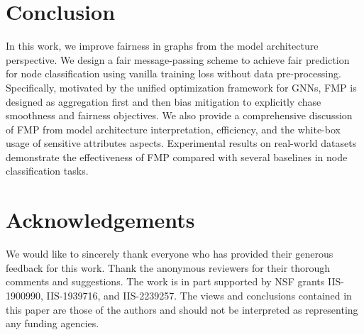 \documentclass[letterpaper]{article} %
\theoremstyle{plain}
\theoremstyle{definition}
\theoremstyle{remark}
\begin{document}
\section{Conclusion}
In this work, we improve fairness in graphs from the model architecture perspective. We design a fair message-passing scheme to achieve fair prediction for node classification using vanilla training loss without data pre-processing. Specifically,
motivated by the unified optimization framework for GNNs, FMP is designed as aggregation first and then bias mitigation to explicitly chase smoothness and fairness objectives. We also provide a comprehensive discussion of FMP from model architecture interpretation, efficiency, and the white-box usage of sensitive attributes aspects. Experimental results on real-world datasets demonstrate the effectiveness of FMP compared with several baselines in node classification tasks.


\section*{Acknowledgements}
We would like to sincerely thank everyone who has provided their generous feedback for this work. Thank the anonymous reviewers for their thorough comments and suggestions. The work is in part supported by NSF grants
IIS-1900990, IIS-1939716, and IIS-2239257. The views and conclusions
contained in this paper are those of the authors and should
not be interpreted as representing any funding agencies.
\end{document}
